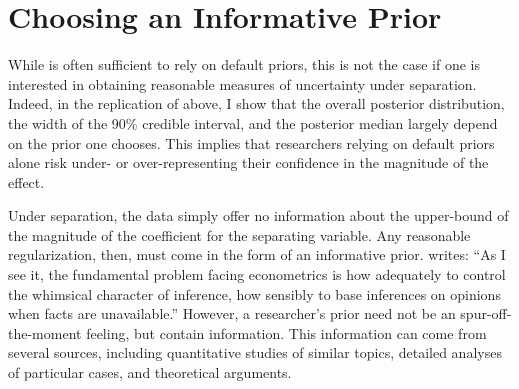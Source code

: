 \documentclass[12pt]{article}
\begin{document}

%

\section*{Choosing an Informative Prior}

While is often sufficient to rely on default priors, this is not the case if one is interested in obtaining reasonable measures of uncertainty under separation. Indeed, in the replication of \cite{BarrilleauxRainey2014} above, I show that the overall posterior distribution, the width of the 90\% credible interval, and the posterior median largely depend on the prior one chooses. This implies that researchers relying on default priors alone risk under- or over-representing their confidence in the magnitude of the effect.

Under separation, the data simply offer no information about the upper-bound of the magnitude of the coefficient for the separating variable. Any reasonable regularization, then, must come in the form of an informative prior. \citet[p. 38]{Leamer1983} writes: ``As I see it, the fundamental problem facing econometrics is how adequately to control the whimsical character of inference, how sensibly to base inferences on opinions when facts are unavailable.'' However, a researcher's prior need not be an spur-off-the-moment feeling, but contain information. This information can come from several sources, including quantitative studies of similar topics, detailed analyses of particular cases, and theoretical arguments.
\end{document}
